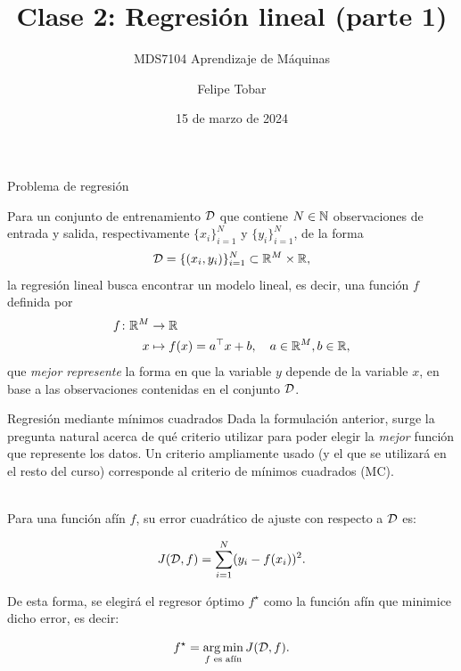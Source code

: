 \documentclass[handout, 9pt]{beamer}
\title{Clase 2: Regresión lineal (parte 1)}
\subtitle{MDS7104 Aprendizaje de Máquinas}
\date{15 de marzo de 2024}
\author{Felipe Tobar}
\institute{Iniciativa de Datos e Inteligencia Artificial\\Universidad de Chile}
\begin{document}
\begin{frame}
  \titlepage
\end{frame}


\begin{frame}{Problema de regresión}
	
Para un conjunto de entrenamiento ${\mathcal D}$ que contiene $N\in{\mathbb N}$ observaciones de entrada y salida, respectivamente $\{x_i\}_{i=1}^N$ y $\{y_i\}_{i=1}^N$, de la forma
\begin{equation*}
	{\mathcal D}=\{(x_i,y_i)\}_{i=1}^N\subset \mathbb{R}^M \times \mathbb{R},
	\label{eq:training_set}
\end{equation*}\pause
la regresión lineal busca encontrar un modelo lineal, es decir, una función $f$ definida por 
\begin{align*}
  f \colon \mathbb{R}^M &\to \mathbb{R}\nonumber\\
  x &\mapsto f(x)=a^\top x + b,\quad a\in\mathbb{R}^M,b\in\mathbb{R},
\end{align*}
que \emph{mejor represente} la forma en que la variable $y$ depende de la variable $x$, en base a las observaciones contenidas en el conjunto ${\mathcal D}$.

\end{frame}

\begin{frame}{Regresión mediante mínimos cuadrados}
Dada la formulación anterior, surge la pregunta natural acerca de qué criterio utilizar para poder elegir la \emph{mejor} función que represente los datos. Un criterio ampliamente usado (y el que se utilizará en el resto del curso) corresponde al criterio de mínimos cuadrados (MC).\\~\ \pause

Para una función afín $f$, su error cuadrático de ajuste con respecto a ${\mathcal D}$ es:

\begin{equation*}
	J({\mathcal D},f) = \sum_{i=1}^N(y_i-f(x_i))^2.
	\label{eq:least_squares_cost}
\end{equation*}\pause

De esta forma, se elegirá el regresor óptimo $f^\star$ como la función afín que minimice dicho error, es decir:

\begin{equation*}
	f^\star = \operatorname*{arg\,min}_{f\text{ es afín}} J({\mathcal D},f).
\end{equation*}

\end{frame}
\end{document}

